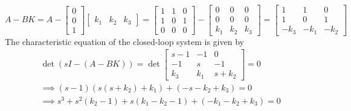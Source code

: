 \begin{equation*}
    A - BK
    =
    A
    -
    \begin{bmatrix}
        0 \\ 0 \\ 1
    \end{bmatrix}
    \begin{bmatrix}
        k_{1} & k_{2} & k_{3}
    \end{bmatrix}
    =
    \begin{bmatrix}
        1 & 1 & 0 \\
        1 & 0 & 1 \\
        0 & 0 & 0
    \end{bmatrix}
    -
    \begin{bmatrix}
        0   & 0   & 0   \\
        0   & 0   & 0   \\
        k_1 & k_2 & k_3
    \end{bmatrix}
    =
    \begin{bmatrix}
        1    & 1    & 0    \\
        1    & 0    & 1    \\
        -k_3 & -k_1 & -k_2
    \end{bmatrix}
\end{equation*}
The characteristic equation of the closed-loop system is given by
\begin{align*}
     &
    \det(sI-(A-BK))
    =
    \det
    \begin{bmatrix}
        s-1   & -1    & 0       \\
        -1    & s     & -1      \\
        k_{3} & k_{1} & s+k_{2}
    \end{bmatrix}
    =
    0
    \\ &
    \implies
    (s-1)(s(s+k_2) + k_1) + (-s-k_2 + k_3) = 0
    \\ &
    \implies
    s^3 + s^2 (k_2 - 1) + s (k_1 - k_2 - 1) + (-k_1 - k_2 + k_3) = 0
\end{align*}

